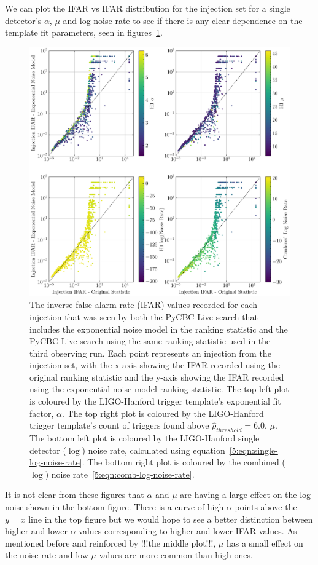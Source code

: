 We can plot the IFAR vs IFAR distribution for the injection set for a single detector's $\alpha$, $\mu$ and log noise rate to see if there is any clear dependence on the template fit parameters, seen in figures~\ref{5:fig:ifar-ifar-subplots}.
%
\begin{figure}
    \centering
    \includegraphics[width=\textwidth]{images/5_pycbclive/fits-only/fits_only_ifar_vs_ifar_subplots.pdf}
    \caption{The inverse false alarm rate (IFAR) values recorded for each injection that was seen by both the PyCBC Live search that includes the exponential noise model in the ranking statistic and the PyCBC Live search using the same ranking statistic used in the third observing run. Each point represents an injection from the injection set, with the x-axis showing the IFAR recorded using the original ranking statistic and the y-axis showing the IFAR recorded using the exponential noise model ranking statistic. The top left plot is coloured by the LIGO-Hanford trigger template's exponential fit factor, $\alpha$. The top right plot is coloured by the LIGO-Hanford trigger template's count of triggers found above $\hat{\rho}_{threshold} = 6.0$, $\mu$. The bottom left plot is coloured by the LIGO-Hanford single detector ($\log$) noise rate, calculated using equation~\ref{5:eqn:single-log-noise-rate}. The bottom right plot is coloured by the combined ($\log$) noise rate~\ref{5:eqn:comb-log-noise-rate}.}
    \label{5:fig:ifar-ifar-subplots}
\end{figure}
%
It is not clear from these figures that $\alpha$ and $\mu$ are having a large effect on the log noise shown in the bottom figure. There is a curve of high $\alpha$ points above the $y=x$ line in the top figure but we would hope to see a better distinction between higher and lower $\alpha$ values corresponding to higher and lower IFAR values. As mentioned before and reinforced by !!!the middle plot!!!, $\mu$ has a small effect on the noise rate and low $\mu$ values are more common than high ones.

